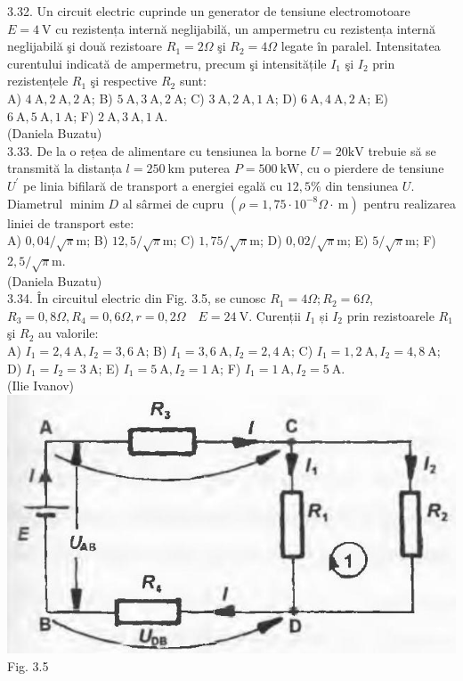 3.32. Un circuit electric cuprinde un generator de tensiune electromotoare $E=4 \mathrm{~V}$ cu rezistența internă neglijabilă, un ampermetru cu rezistența internă neglijabilă şi două rezistoare $R_{1}=2 \Omega$ şi $R_{2}=4 \Omega$ legate în paralel. Intensitatea curentului indicată de ampermetru, precum şi intensitățile $I_{1}$ şi $I_{2}$ prin rezistențele $R_{1}$ şi respective $R_{2}$ sunt:\\ A) $4 \mathrm{~A} , 2 \mathrm{~A} , 2 \mathrm{~A}$; B) $5 \mathrm{~A} , 3 \mathrm{~A} , 2 \mathrm{~A}$; C) $3 \mathrm{~A} , 2 \mathrm{~A} , 1 \mathrm{~A}$; D) $6 \mathrm{~A} , 4 \mathrm{~A} , 2 \mathrm{~A}$; E) $6 \mathrm{~A} , 5 \mathrm{~A} , 1 \mathrm{~A}$; F) $2 \mathrm{~A} , 3 \mathrm{~A} , 1 \mathrm{~A}$.\\ (Daniela Buzatu)\\

3.33. De la o rețea de alimentare cu tensiunea la borne $U=20 \mathrm{kV}$ trebuie să se transmită la distanța $l=250 \mathrm{~km}$ puterea $P=500 \mathrm{~kW}$, cu o pierdere de tensiune $U^{\prime}$ pe linia bifilară de transport a energiei egală cu $12,5 \%$ din tensiunea $U$. Diametrul $\operatorname{minim} D$ al sârmei de cupru $\left(\rho=1,75 \cdot 10^{-8} \Omega \cdot \mathrm{~m}\right)$ pentru realizarea liniei de transport este:\\ A) $0,04 / \sqrt{\pi} \mathrm{m}$; B) $12,5 / \sqrt{\pi} \mathrm{m}$; C) $1,75 / \sqrt{\pi} \mathrm{m}$; D) $0,02 / \sqrt{\pi} \mathrm{m}$; E) $5 / \sqrt{\pi} \mathrm{m}$; F) $2,5 / \sqrt{\pi} \mathrm{m}$.\\ (Daniela Buzatu)\\

3.34. În circuitul electric din Fig. 3.5, se cunosc $R_{1}=4 \Omega ; R_{2}=6 \Omega$, $R_{3}=0,8 \Omega, R_{4}=0,6 \Omega, r=0,2 \Omega \quad E=24 \mathrm{~V}$. Curenții $I_{1}$ și $I_{2}$ prin rezistoarele $R_{1}$ şi $R_{2}$ au valorile:\\ A) $I_{1}=2,4 \mathrm{~A} , I_{2}=3,6 \mathrm{~A}$; B) $I_{1}=3,6 \mathrm{~A} , I_{2}=2,4 \mathrm{~A}$; C) $I_{1}=1,2 \mathrm{~A} , I_{2}=4,8 \mathrm{~A}$; D) $I_{1}=I_{2}=3 \mathrm{~A}$; E) $I_{1}=5 \mathrm{~A} , I_{2}=1 \mathrm{~A}$; F) $I_{1}=1 \mathrm{~A} , I_{2}=5 \mathrm{~A}$.\\ (Ilie Ivanov)\\ \includegraphics[width=0.4\linewidth]{images/2025_07_01_5b3ff9fa0d508c8e9f17g-151(3)} Fig. 3.5\\

